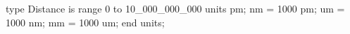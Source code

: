 type Distance is range 0 to 10_000_000_000
    units
        pm;
        nm = 1000 pm;
        um = 1000 nm;
        mm = 1000 um;
    end units;